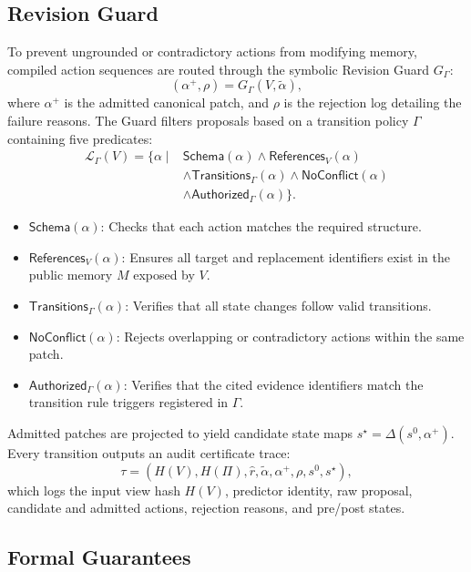 \subsection{Revision Guard}
To prevent ungrounded or contradictory actions from modifying memory, compiled action sequences are routed through the symbolic Revision Guard $G_\Gamma$:
\begin{equation}
(\alpha^+, \rho) = G_\Gamma(V, \widetilde{\alpha}),
\end{equation}
where $\alpha^+$ is the admitted canonical patch, and $\rho$ is the rejection log detailing the failure reasons. The Guard filters proposals based on a transition policy $\Gamma$ containing five predicates:
\begin{align*}
\mathcal{L}_\Gamma(V)=\{\alpha\mid
&\mathsf{Schema}(\alpha)\land\mathsf{References}_V(\alpha)\\
&\land\mathsf{Transitions}_\Gamma(\alpha)
\land\mathsf{NoConflict}(\alpha)\\
&\land\mathsf{Authorized}_\Gamma(\alpha)\}.
\end{align*}
\begin{itemize}[leftmargin=*]
\item $\mathsf{Schema}(\alpha)$: Checks that each action matches the required structure.
\item $\mathsf{References}_V(\alpha)$: Ensures all target and replacement identifiers exist in the public memory $M$ exposed by $V$.
\item $\mathsf{Transitions}_\Gamma(\alpha)$: Verifies that all state changes follow valid transitions.
\item $\mathsf{NoConflict}(\alpha)$: Rejects overlapping or contradictory actions within the same patch.
\item $\mathsf{Authorized}_\Gamma(\alpha)$: Verifies that the cited evidence identifiers match the transition rule triggers registered in $\Gamma$.
\end{itemize}
Admitted patches are projected to yield candidate state maps $s^\star = \Delta(s^0, \alpha^+)$.
Every transition outputs an audit certificate trace:
\begin{equation}
\tau = (H(V), H(\Pi), \widehat{r}, \widetilde{\alpha}, \alpha^+, \rho, s^0, s^\star),
\end{equation}
which logs the input view hash $H(V)$, predictor identity, raw proposal, candidate and admitted actions, rejection reasons, and pre/post states.

\subsection{Formal Guarantees}

